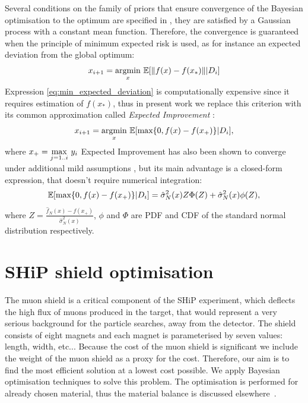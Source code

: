 \documentclass[a4paper]{jpconf}
\theoremstyle{my_theorem_style}
\numberwithin{equation}{section}
\begin{document}
Several conditions on the family of priors that ensure convergence of the Bayesian optimisation to the optimum are specified in \cite{Mockus1994}, they are satisfied by a Gaussian process with a constant mean function. Therefore, the convergence is guaranteed when the principle of minimum expected risk is used, as for instance an expected deviation from the global optimum:
\begin{equation}
\label{eq:min_expected_deviation}
x_{i + 1} = \underset{x}{\textup{argmin}}\ \mathbb{E}[\|f(x) - f(x_*)\|  | D_i]
\end{equation}
Expression \ref{eq:min_expected_deviation} is computationally expensive since it requires estimation of $f(x_*)$, thus in present work we replace this criterion with its common approximation called \emph{Expected Improvement} \cite{Mockus1978}:
\begin{equation}
\label{EI}
x_{i + 1} = \underset{x}{\textup{argmin}}\ \mathbb{E}[\textup{max}\{0, f(x) - f(x_+)\}  | D_i],
\end{equation} 
where $x_+ = \underset{j = 1..i}{\textup{max}}\ y_i$
Expected Improvement has also been shown to converge under additional mild assumptions \cite{vazquez2010convergence}, but its main advantage is a closed-form expression, that doesn't require numerical integration:
\begin{equation}
\label{EI:closed_form}
\mathbb{E}[\textup{max}\{0, f(x) - f(x_+)\}  | D_i] = \hat{\sigma}_N^2(x) Z \Phi(Z) + \hat{\sigma}_N^2(x) \phi(Z),
\end{equation}
where $Z = \frac{\hat{f}_N(x) - f(x_+)}{\hat{\sigma}_N^2(x)}$, $\phi$ and $\Phi$ are PDF and CDF of the standard normal distribution respectively.


\section{SHiP shield optimisation}

The muon shield is a critical component of the SHiP experiment, which deflects the
high flux of muons produced in the target, that would represent a very
serious  background for the particle searches, away from the
detector. The shield consists of eight magnets and each magnet is
parameterised by seven values: length, width, etc... Because the cost of the
muon shield is significant we include the weight of the muon shield as
a proxy for the cost. Therefore, our aim is to find the most efficient
solution at a lowest cost possible. We apply Bayesian optimisation
techniques to solve this problem. The optimisation is performed for already chosen material, thus the material balance is discussed elsewhere~\cite{Akmete:2017bpl}.
\end{document}
